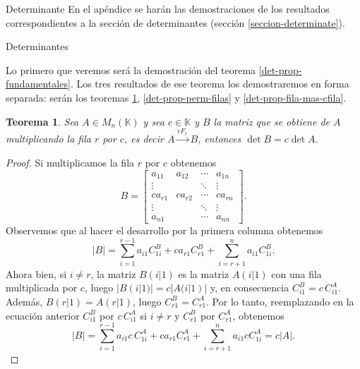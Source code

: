 \documentclass[a4paper,12pt,twoside,spanish]{amsbook}
\newtheorem{teorema}{Teorema}[section]
\theoremstyle{definition}
\theoremstyle{remark}
\newcommand{\K}{\mathbb K}
\begin{document}
	\begin{chapter}{Determinante}\label{apend.Determinante}
		En  el apéndice se harán las demostraciones de los resultados correspondientes a la sección de determinantes (sección  \ref{seccion-determinate}).
		
		\begin{section}{Determinantes}
			
		Lo primero que veremos será la demostración del  teorema \ref{det-prop-fundamentales}. Los tres resultados de ese teorema los demostraremos en forma separada: serán los teoremas \ref{det-prop-mult-esc}, \ref{det-prop-perm-filas} y \ref{det-prop-fila-mas-cfila}.
		
		
		\begin{teorema} \label{det-prop-mult-esc}
			Sea $A  \in M_n(\K)$ y sea $c \in \K$ y $B$ la matriz que se obtiene de $A$ multiplicando la fila $r$ por $c$, es decir $A  \stackrel{cF_r}{\longrightarrow} B$, entonces $\det B = c \det A$.
		\end{teorema}
		\begin{proof}
			Si multiplicamos la fila $r$ por $c$ obtenemos
			\begin{equation*}
			B = \begin{bmatrix}
			a_{11}&a_{12}&\cdots&a_{1n}\\
			\vdots&&\ddots&\vdots \\
			ca_{r1}&ca_{r2}&\cdots&ca_{rn} \\
			\vdots&&\ddots&\vdots \\
			a_{n1}&&\cdots&a_{nn}
			\end{bmatrix}.
			\end{equation*}
			Observemos que al hacer el desarrollo por la primera columna obtenemos
			\begin{equation*}
			|B| = \sum_{i=1}^{r-1}  a_{i1}C^B_{1i} + ca_{r1}C^B_{r1} + \sum_{i=r+1}^{n}  a_{i1}C^B_{1i}.
			\end{equation*}
			Ahora bien, si $i \ne r$, la matriz $B(i|1)$ es la matriz   $A(i|1)$ con una fila multiplicada por $c$, luego $|B(i|1)| = c|A(i|1)|$ y, en consecuencia $C^B_{i1} = c\,C^A_{i1}$. Además, $B(r|1) = A(r|1)$, luego  $C^B_{r1} = C^A_{r1}$. Por lo tanto, reemplazando en la ecuación anterior $C^B_{i1}$ por $c\,C^A_{i1}$ si $i\ne r$ y $C^B_{r1}$ por $C^A_{r1}$, obtenemos
			\begin{equation*}
			|B| = \sum_{i=1}^{r-1}  a_{i1}c\,C^A_{1i} + ca_{r1}C^A_{r1} + \sum_{i=r+1}^{n}  a_{i1}cC^A_{1i} = c|A|.
			\end{equation*}
		\end{proof}
		


\end{section}
\end{chapter}
\end{document}
